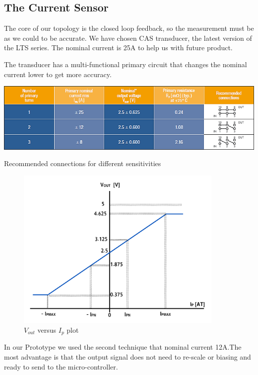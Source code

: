 \documentclass[12pt,a4paper]{book}
\begin{document}
\subsection{The Current Sensor}
The core of our topology is the closed loop feedback, so the measurement must be as we could to be accurate. We have chosen CAS transducer, the latest version of the LTS series. The nominal current is 25A to help us with future product.

The transducer has a multi-functional primary circuit that changes the nominal current lower to get more accuracy.
\begin{table}[h!]
  \centering
  \includegraphics[width=14cm]{table2.png}
  \caption{Recommended connections for different sensitivities}
\end{table}
\begin{figure}[h!]
  \centering
  \includegraphics[width = 10cm]{image32.png}
  \caption{$V_{out}$ versus $I_{p}$ plot}
  \label{fig:image32}
\end{figure}
In our Prototype we used the second technique that nominal current 12A.The most advantage is that the output signal does not need to re-scale or biasing and ready to send to the micro-controller.

\end{document}
